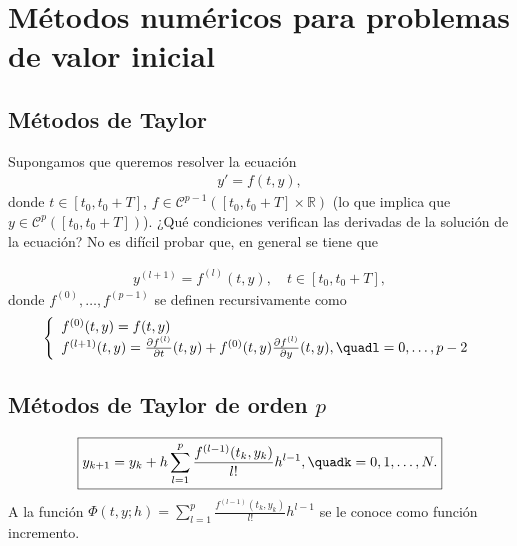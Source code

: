 \chapter{Métodos numéricos para problemas de valor inicial}

\section{Métodos de Taylor}
\noindent Supongamos que queremos resolver la ecuación 
\begin{align*}
    y' = f(t,y) ,
\end{align*}
donde $t \in [t_0,t_0 + T]$, $f \in \mathscr{C}^{p-1}([t_0,t_0+T] \times \mathbb{R})$ (lo que implica que $y \in \mathscr{C}^p([t_0,t_0+T])$). ¿Qué condiciones verifican las derivadas de la solución de la ecuación? No es difícil probar que, en general se tiene que

\begin{align*}
    y^{(l+1)} = f^{(l)}(t,y), \quad t \in [t_0,t_0+T],
\end{align*}
donde $f^{(0)},\ldots,f^{(p-1)}$ se definen recursivamente como
\begin{align*}
    \left\{ \begin{array}{lcc}
             f^{(0)}(t,y) = f(t,y)\\
             f^{(l+1)}(t,y) = \frac{\partial f^{(l)}}{\partial t}(t,y) + f^{(0)}(t,y)\frac{\partial f^{(l)}}{\partial y}(t,y), \quadl = 0,\ldots,p-2 \\
             \end{array}
   \right.
\end{align*}

\section{Métodos de Taylor de orden $p$}

\begin{align*}
\boxed{
    y_{k+1} = y_k + h\sum_{l=1}^{p} \frac{f^{(l-1)}(t_k,y_k)}{l!} h^{l-1}, \quadk = 0,1,\ldots,N.
}
\end{align*}
A la función $\Phi(t,y;h) = \sum_{l=1}^{p} \frac{f^{(l-1)}(t_k,y_k)}{l!} h^{l-1}$ se le conoce como función incremento.

